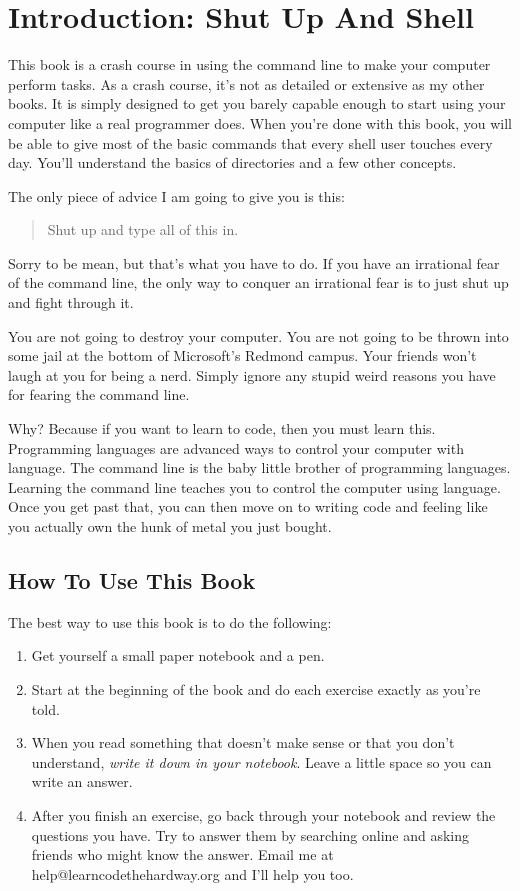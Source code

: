 \chapter*{Introduction: Shut Up And Shell}

This book is a crash course in using the command line to make your computer perform tasks.  As a crash course, it's not as detailed or extensive as my other
books.  It is simply designed to get you barely capable enough to start using
your computer like a real programmer does.  When you're done with this book, you will
be able to give most of the basic commands that every shell user touches every
day.  You'll understand the basics of directories and a few other concepts.

The only piece of advice I am going to give you is this:

\begin{quote}
Shut up and type all of this in.
\end{quote}

Sorry to be mean, but that's what you have to do.  If you have an irrational fear
of the command line, the only way to conquer an irrational fear is to just
shut up and fight through it.

You are not going to destroy your computer.  You are not going to be thrown
into some jail at the bottom of Microsoft's Redmond campus.  Your friends won't
laugh at you for being a nerd.  Simply ignore any stupid weird reasons you have
for fearing the command line.

Why?  Because if you want to learn to code, then you must learn this.
Programming languages are advanced ways to control your computer with language.
The command line is the baby little brother of programming languages.  Learning
the command line teaches you to control the computer using language.  Once you
get past that, you can then move on to writing code and feeling like you
actually own the hunk of metal you just bought.

\section{How To Use This Book}

The best way to use this book is to do the following:

\begin{enumerate}
\item Get yourself a small paper notebook and a pen.
\item Start at the beginning of the book and do each exercise exactly as you're told.
\item When you read something that doesn't make sense or that you don't understand, \emph{write it down in your notebook}.
    Leave a little space so you can write an answer.
\item After you finish an exercise, go back through your notebook and review the questions you have.  Try to answer them
    by searching online and asking friends who might know the answer.  Email me at help@learncodethehardway.org and I'll
    help you too.
\end{enumerate}


